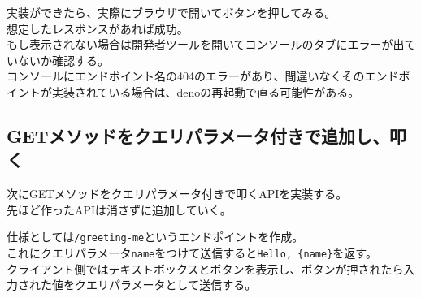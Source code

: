\begin{Shaded}
\begin{Highlighting}[]
    \NormalTok{(}\NormalTok{)} \OperatorTok{=} \NormalTok{ () }\KeywordTok{=\textgreater{}}\NormalTok{ \{}
      \OperatorTok{=}  \NormalTok{(}\NormalTok{)}\OperatorTok{;}
      \NormalTok{(}\NormalTok{)} \OperatorTok{=} \NormalTok{()}\OperatorTok{;}
\NormalTok{    \}}\OperatorTok{;}
  \DataTypeTok{\textless{}/}\DataTypeTok{\textgreater{}}
\DataTypeTok{\textless{}/}\DataTypeTok{\textgreater{}}

\DataTypeTok{\textless{}/}\DataTypeTok{\textgreater{}}
\end{Highlighting}
\end{Shaded}

実装ができたら、実際にブラウザで開いてボタンを押してみる。\\
想定したレスポンスがあれば成功。\\
もし表示されない場合は開発者ツールを開いてコンソールのタブにエラーが出ていないか確認する。\\
コンソールにエンドポイント名の404のエラーがあり、間違いなくそのエンドポイントが実装されている場合は、denoの再起動で直る可能性がある。

\subsection{GETメソッドをクエリパラメータ付きで追加し、叩く}\label{getux30e1ux30bdux30c3ux30c9ux3092ux30afux30a8ux30eaux30d1ux30e9ux30e1ux30fcux30bfux4ed8ux304dux3067ux8ffdux52a0ux3057ux53e9ux304f}

次にGETメソッドをクエリパラメータ付きで叩くAPIを実装する。\\
先ほど作ったAPIは消さずに追加していく。

仕様としては\texttt{/greeting-me}というエンドポイントを作成。\\
これにクエリパラメータ\texttt{name}をつけて送信すると\texttt{Hello,\ \{name\}}を返す。\\
クライアント側ではテキストボックスとボタンを表示し、ボタンが押されたら入力された値をクエリパラメータとして送信する。

